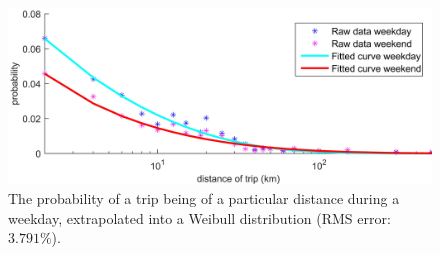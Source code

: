\begin{figure}[htb]\centering
	\includegraphics{_chapter1/fig/input/distance-probability}
 \caption{The probability of a trip being of a particular distance during a weekday, extrapolated into a Weibull distribution (RMS error: $3.791\%$).}
 \label{ch1:fig:trip-distance-probability}
\end{figure}
